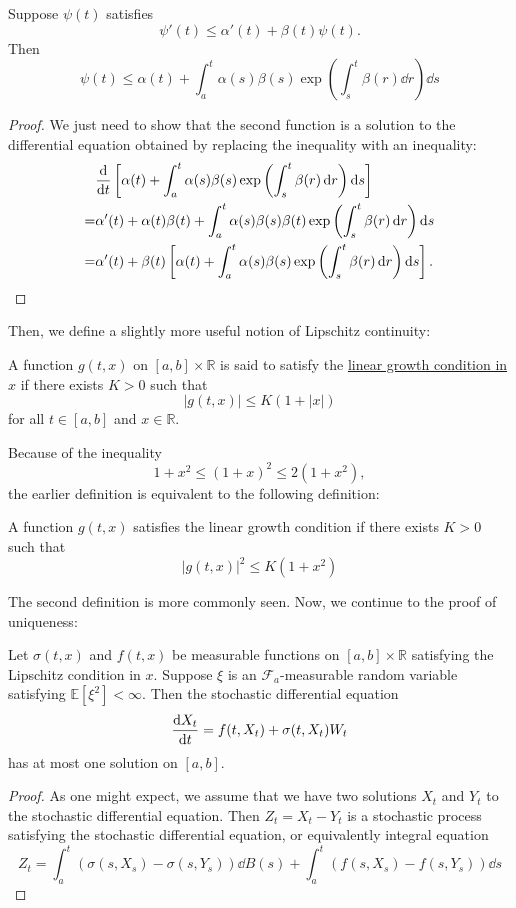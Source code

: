 \documentclass[prb,12pt]{revtex4-2}
\theoremstyle{definition}
\theoremstyle{definition}
\theoremstyle{definition}
\newcommand{\R}{\mathbb{R}}
\begin{document}
\begin{Corollary}
	Suppose $\psi(t)$ satisfies
	\[\psi'(t) \le \alpha'(t)+\beta(t)\psi(t).\]
	Then
	\[\psi(t)\le \alpha(t)+\int_a^t \alpha(s)\beta(s)\exp\left(\int_s^t \beta(r)\dd{r}\right)\dd{s}\]
\end{Corollary}
\begin{proof}
	We just need to show that the second function is a solution to the differential equation obtained by replacing the inequality with an inequality:
	\begin{align*}
		&\dv{t}\left[\alpha(t) + \int_a^t \alpha(s)\beta(s)\exp\left(\int_s^t \beta(r)\dd{r}\right)\dd{s}\right]\\
		=&\alpha'(t)+\alpha(t)\beta(t)+\int_a^t \alpha(s)\beta(s)\beta(t)\exp\left(\int_s^t \beta(r)\dd{r}\right)\dd{s}\\
		=&\alpha'(t)+\beta(t)\left[\alpha(t) + \int_a^t \alpha(s)\beta(s)\exp\left(\int_s^t \beta(r)\dd{r}\right)\dd{s}\right].\qedhere
	\end{align*}
\end{proof}
Then, we define a slightly more useful notion of Lipschitz continuity:
\begin{Definition}
	A function $g(t, x)$ on $[a,b]\times \R$ is said to satisfy the \uline{linear growth condition in $x$} if there exists $K>0$ such that
	\[|g(t, x)|\le K(1+|x|)\]
	for all $t\in [a,b]$ and $x\in \R$.
\end{Definition}
Because of the inequality
\[1+x^2 \le (1+x)^2 \le 2(1+x^2),\]
the earlier definition is equivalent to the following definition:
\begin{Proposition}
	A function $g(t,x)$ satisfies the linear growth condition if there exists $K>0$ such that
	\[|g(t,x)|^2 \le K(1+x^2)\]
\end{Proposition}
The second definition is more commonly seen. Now, we continue to the proof of uniqueness:
\begin{Theorem}
	Let $\sigma(t,x)$ and $f(t,x)$ be measurable functions on $[a,b]\times \R$ satisfying the Lipschitz condition in $x$. Suppose $\xi$ is an $\mathcal{F}_a$-measurable random variable satisfying $\mathbb{E}[\xi^2]<\infty$. Then the stochastic differential equation
	\[\dv{X_t}{t}=f(t, X_t)+\sigma(t, X_t)W_t\]
	has at most one solution on $[a,b]$.
\end{Theorem}
\begin{proof}
	As one might expect, we assume that we have two solutions $X_t$ and $Y_t$ to the stochastic differential equation. Then $Z_t=X_t-Y_t$ is a stochastic process satisfying the stochastic differential equation, or equivalently integral equation
	\[Z_t = \int_a^t (\sigma(s, X_s) - \sigma (s, Y_s))\dd{B(s)}+\int_a^t (f(s, X_s) - f(s, Y_s))\dd{s}\]
\end{proof}


\end{document}
